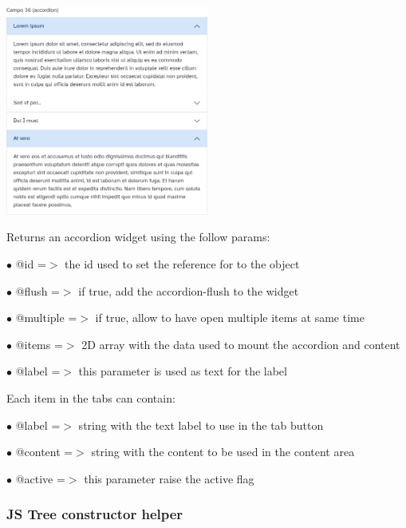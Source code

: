 \documentclass[a4paper]{article}
\begin{document}
\begin{center}\includegraphics[width=0.5\textwidth]{../ujest/snaps/test-bootstrap-js-bootstrap-campo-36-accordion-1-snap.png}\end{center}

Returns an accordion widget using the follow params:

\begin{compactitem}
\item[\color{myblue}$\bullet$] @id       =$>$ the id used to set the reference for to the object
\item[\color{myblue}$\bullet$] @flush    =$>$ if true, add the accordion-flush to the widget
\item[\color{myblue}$\bullet$] @multiple =$>$ if true, allow to have open multiple items at same time
\item[\color{myblue}$\bullet$] @items    =$>$ 2D array with the data used to mount the accordion and content
\item[\color{myblue}$\bullet$] @label    =$>$ this parameter is used as text for the label
\end{compactitem}

Each item in the tabs can contain:

\begin{compactitem}
\item[\color{myblue}$\bullet$] @label    =$>$ string with the text label to use in the tab button
\item[\color{myblue}$\bullet$] @content  =$>$ string with the content to be used in the content area
\item[\color{myblue}$\bullet$] @active   =$>$ this parameter raise the active flag
\end{compactitem}

\hypertarget{toc91}{}
\subsubsection{JS Tree constructor helper}
\end{document}
